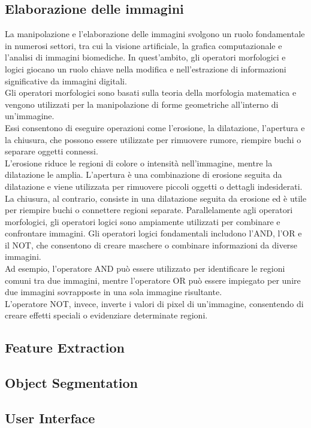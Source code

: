 \documentclass[a4paper,12pt]{report}
\begin{document}
\subsection{Elaborazione delle immagini}
La manipolazione e l'elaborazione delle immagini svolgono un ruolo fondamentale in numerosi settori, tra cui la visione artificiale, la grafica computazionale e l'analisi di immagini biomediche. 
In quest'ambito, gli operatori morfologici e logici giocano un ruolo chiave nella modifica e nell'estrazione di informazioni significative da immagini digitali. \\
Gli operatori morfologici sono basati sulla teoria della morfologia matematica e vengono utilizzati per la manipolazione di forme geometriche all'interno di un'immagine. \\
Essi consentono di eseguire operazioni come l'erosione, la dilatazione, l'apertura e la chiusura, che possono essere utilizzate per rimuovere rumore, riempire buchi o separare oggetti connessi. \\
L'erosione riduce le regioni di colore o intensità nell'immagine, mentre la dilatazione le amplia. L'apertura è una combinazione di erosione seguita da dilatazione e viene utilizzata per rimuovere piccoli oggetti o dettagli indesiderati. La chiusura, al contrario, consiste in una dilatazione seguita da erosione ed è utile per riempire buchi o connettere regioni separate.
Parallelamente agli operatori morfologici, gli operatori logici sono ampiamente utilizzati per combinare e confrontare immagini. Gli operatori logici fondamentali includono l'AND, l'OR e il NOT, che consentono di creare maschere o combinare informazioni da diverse immagini. \\
Ad esempio, l'operatore AND può essere utilizzato per identificare le regioni comuni tra due immagini, mentre l'operatore OR può essere impiegato per unire due immagini sovrapposte in una sola immagine risultante. \\
L'operatore NOT, invece, inverte i valori di pixel di un'immagine, consentendo di creare effetti speciali o evidenziare determinate regioni.
\subsection{Feature Extraction}
\subsection{Object Segmentation}
\subsection{User Interface}
\end{document}
